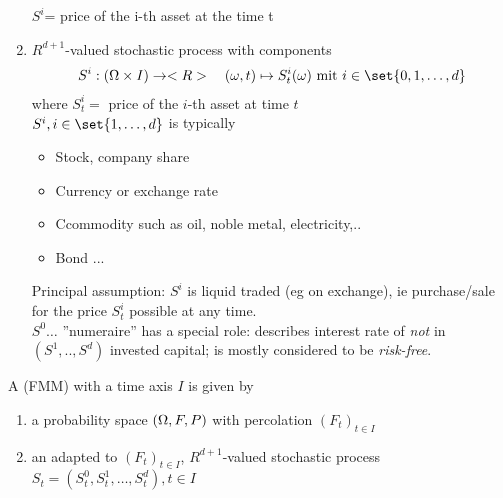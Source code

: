 \begin{enumerate}
\begin{itemize}
	\end{itemize}
	$S^i$= price of the i-th asset at the time t
	\item {} $R^{d+1}$-valued  stochastic process with components
	\begin{align*}
		S^i: (\O \times I) \to \R\quad (\omega,t) \mapsto S^i_t(\omega) \mit i \in \set{0,1,\dots,d}
	\end{align*} 
	where $S^i_t=$ price of the $i$-th asset at time $t$\\
	$S^i, i \in \set{1,\dots,d}$ is typically
	\begin{itemize}
		\item Stock, company share
		\item Currency or exchange rate
		\item Ccommodity such as oil, noble metal, electricity,..
		\item Bond ... 
	\end{itemize}
	Principal assumption: $S^i$ is liquid traded (eg on exchange), ie purchase/sale for the price $S_t^i$ possible at any time.\\
	
	$S^0\dots$ ''numeraire'' has a special role: describes interest rate of \emph{not} in $(S^1,..,S^d)$ invested capital; is mostly considered to be \emph{risk-free}.
\end{enumerate}

\begin{definition}
	A  (FMM) with a time axis $I$ is given by
	\begin{enumerate}
		\item a probability space $(\Omega, F,P)$ with percolation $(F_t)_{t\in I}$
		\item an adapted to $(F_t)_{t \in I}$, $R^{d+1}$-valued stochastic process $S_t = (S^0_t, S_t^1, \dots, S^d_t),t \in I$
	\end{enumerate} 
\end{definition}

